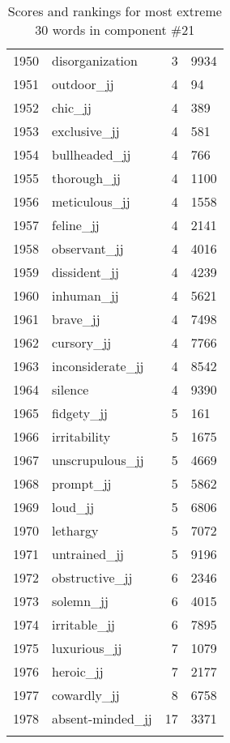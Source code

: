 \begin{longtable}[!htbp]{| rlr@{.}l |}
    1950 & disorganization & 3 & 9934 \\
    1951 & outdoor\_jj & 4 & 94 \\
    1952 & chic\_jj & 4 & 389 \\
    1953 & exclusive\_jj & 4 & 581 \\
    1954 & bullheaded\_jj & 4 & 766 \\
    1955 & thorough\_jj & 4 & 1100 \\
    1956 & meticulous\_jj & 4 & 1558 \\
    1957 & feline\_jj & 4 & 2141 \\
    1958 & observant\_jj & 4 & 4016 \\
    1959 & dissident\_jj & 4 & 4239 \\
    1960 & inhuman\_jj & 4 & 5621 \\
    1961 & brave\_jj & 4 & 7498 \\
    1962 & cursory\_jj & 4 & 7766 \\
    1963 & inconsiderate\_jj & 4 & 8542 \\
    1964 & silence & 4 & 9390 \\
    1965 & fidgety\_jj & 5 & 161 \\
    1966 & irritability & 5 & 1675 \\
    1967 & unscrupulous\_jj & 5 & 4669 \\
    1968 & prompt\_jj & 5 & 5862 \\
    1969 & loud\_jj & 5 & 6806 \\
    1970 & lethargy & 5 & 7072 \\
    1971 & untrained\_jj & 5 & 9196 \\
    1972 & obstructive\_jj & 6 & 2346 \\
    1973 & solemn\_jj & 6 & 4015 \\
    1974 & irritable\_jj & 6 & 7895 \\
    1975 & luxurious\_jj & 7 & 1079 \\
    1976 & heroic\_jj & 7 & 2177 \\
    1977 & cowardly\_jj & 8 & 6758 \\
    1978 & absent-minded\_jj & 17 & 3371 \\
    \hline
    \caption{Scores and rankings for most extreme 30 words in component \#21} \\
\end{longtable}
